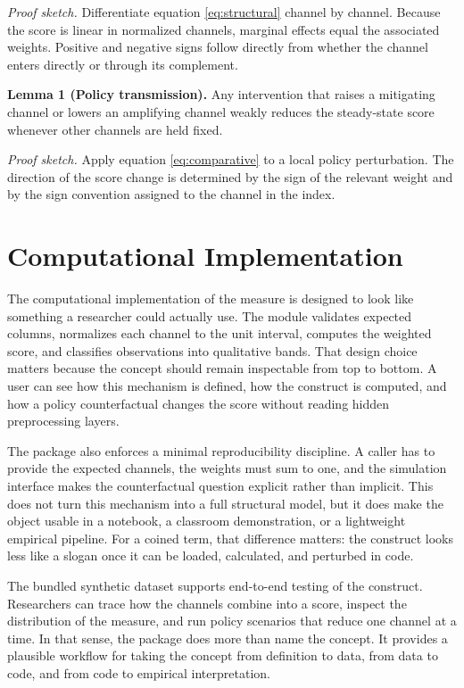 \documentclass[12pt]{article}
\begin{document}
\textit{Proof sketch.} Differentiate equation \eqref{eq:structural} channel by channel. Because the score is linear in normalized channels, marginal effects equal the associated weights. Positive and negative signs follow directly from whether the channel enters directly or through its complement.

\textbf{Lemma 1 (Policy transmission).} Any intervention that raises a mitigating channel or lowers an amplifying channel weakly reduces the steady-state score whenever other channels are held fixed.

\textit{Proof sketch.} Apply equation \eqref{eq:comparative} to a local policy perturbation. The direction of the score change is determined by the sign of the relevant weight and by the sign convention assigned to the channel in the index.

\section{Computational Implementation}
The computational implementation of the measure is designed to look like something a researcher could actually use. The module validates expected columns, normalizes each channel to the unit interval, computes the weighted score, and classifies observations into qualitative bands. That design choice matters because the concept should remain inspectable from top to bottom. A user can see how this mechanism is defined, how the construct is computed, and how a policy counterfactual changes the score without reading hidden preprocessing layers.

The package also enforces a minimal reproducibility discipline. A caller has to provide the expected channels, the weights must sum to one, and the simulation interface makes the counterfactual question explicit rather than implicit. This does not turn this mechanism into a full structural model, but it does make the object usable in a notebook, a classroom demonstration, or a lightweight empirical pipeline. For a coined term, that difference matters: the construct looks less like a slogan once it can be loaded, calculated, and perturbed in code.

The bundled synthetic dataset supports end-to-end testing of the construct. Researchers can trace how the channels combine into a score, inspect the distribution of the measure, and run policy scenarios that reduce one channel at a time. In that sense, the package does more than name the concept. It provides a plausible workflow for taking the concept from definition to data, from data to code, and from code to empirical interpretation.
\end{document}
